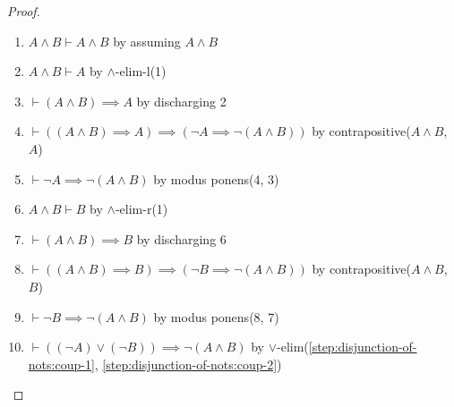 \begin{proof}
\begin{enumerate}
\item $A\land B\vdash A\land B$ by assuming $A\land B$%
\item $A\land B\vdash A$ by $\land$-elim-l(1)%
\item $\vdash(A\land B)\implies A$ by discharging 2%
\item $\vdash((A\land B)\implies A)\implies(\neg A\implies\neg(A\land B))$
  by {\Tt{}contrapositive\nwendquote}($A\land B$, $A$)%
\item\label{step:disjunction-of-nots:coup-1} $\vdash\neg A\implies\neg(A\land B)$
by modus ponens(4, 3)%
\item $A\land B\vdash B$ by $\land$-elim-r(1)%
\item $\vdash(A\land B)\implies B$ by discharging 6%
\item $\vdash((A\land B)\implies B)\implies(\neg B\implies\neg(A\land B))$
  by {\Tt{}contrapositive\nwendquote}($A\land B$, $B$)%
\item\label{step:disjunction-of-nots:coup-2} $\vdash\neg B\implies\neg(A\land B)$
  by modus ponens(8, 7)%
\item $\vdash((\neg A)\lor(\neg B))\implies\neg(A\land B)$
  by $\lor$-elim(\ref{step:disjunction-of-nots:coup-1}, \ref{step:disjunction-of-nots:coup-2})\qedhere
\end{enumerate}
\end{proof}

